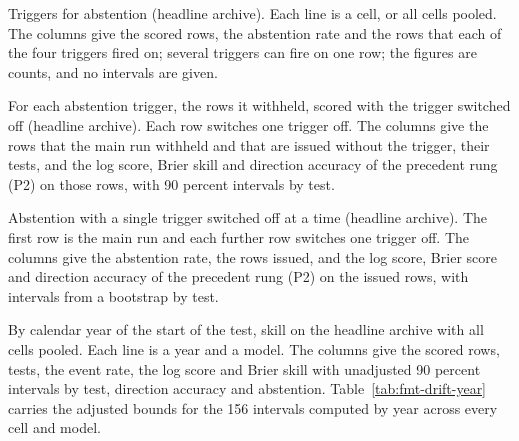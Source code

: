 \begin{table}[tp]\centering\small
\caption{Triggers for abstention (headline archive). Each line is a cell, or all cells pooled. The columns give the scored rows, the abstention rate and the rows that each of the four triggers fired on; several triggers can fire on one row; the figures are counts, and no intervals are given.}
\label{tab:abstention-upworthy}
\resizebox{\columnwidth}{!}{}
\end{table}

\begin{table}[tp]\centering\scriptsize
\caption{For each abstention trigger, the rows it withheld, scored with the trigger switched off (headline archive). Each row switches one trigger off. The columns give the rows that the main run withheld and that are issued without the trigger, their tests, and the log score, Brier skill and direction accuracy of the precedent rung (P2) on those rows, with 90 percent intervals by test.}
\label{tab:trigger-released}
\resizebox{\columnwidth}{!}{}
\end{table}

\begin{table}[tp]\centering\scriptsize
\caption{Abstention with a single trigger switched off at a time (headline archive). The first row is the main run and each further row switches one trigger off. The columns give the abstention rate, the rows issued, and the log score, Brier score and direction accuracy of the precedent rung (P2) on the issued rows, with intervals from a bootstrap by test.}
\label{tab:trigger-ablation}
\resizebox{\columnwidth}{!}{}
\end{table}

\begin{table}[tp]\centering\scriptsize
\caption{By calendar year of the start of the test, skill on the headline archive with all cells pooled. Each line is a year and a model. The columns give the scored rows, tests, the event rate, the log score and Brier skill with unadjusted 90 percent intervals by test, direction accuracy and abstention. Table~\ref{tab:fmt-drift-year} carries the adjusted bounds for the 156 intervals computed by year across every cell and model.}
\label{tab:drift}
\resizebox{\columnwidth}{!}{}
\end{table}

